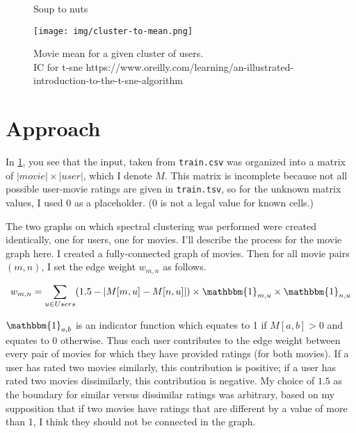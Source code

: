 \documentclass{article}
\begin{document}
\begin{figure}
    \caption{Soup to nuts}
    \label{fig:clustering}
\end{figure}

\begin{figure}
    \centering
    \texttt{[image: img/cluster-to-mean.png]}
    \caption{Movie mean for a given cluster of users. \\ \tiny IC for t-sne https://www.oreilly.com/learning/an-illustrated-introduction-to-the-t-sne-algorithm }
    \label{fig:movie-mean}
\end{figure}

\section{Approach} \label{section:Approach}

    In \ref{fig:clustering}, you see that the input, taken from \texttt{train.csv} was organized into a matrix of $|movie|\times |user|$, which I denote $M$. This matrix is incomplete because not all possible user-movie ratings are given in \texttt{train.tsv}, so for the unknown matrix values, I used 0 as a placeholder. (0 is not a legal value for known cells.)
    
    The two graphs on which spectral clustering was performed were created identically, one for users, one for movies. I'll describe the process for the movie graph here. I created a fully-connected graph of movies. Then for all movie pairs $(m,n)$, I set the edge weight $w_{m,n}$ as follows.
    
    $$w_{m,n} = \sum_{u \in Users} (1.5 - |M[m,u] - M[n,u]|) \times \mathbbm{1}_{m,u} \times \mathbbm{1}_{n,u} $$
    
    $\mathbbm{1}_{a,b}$ is an indicator function which equates to 1 if $M[a,b] > 0$ and equates to 0 otherwise. Thus each user contributes to the edge weight between every pair of movies for which they have provided ratings (for both movies). If a user has rated two movies similarly, this contribution is positive; if a user has rated two movies dissimilarly, this contribution is negative. My choice of $1.5$ as the boundary for similar versus dissimilar ratings was arbitrary, based on my supposition that if two movies have ratings that are different by a value of more than 1, I think they should not be connected in the graph.
\end{document}
